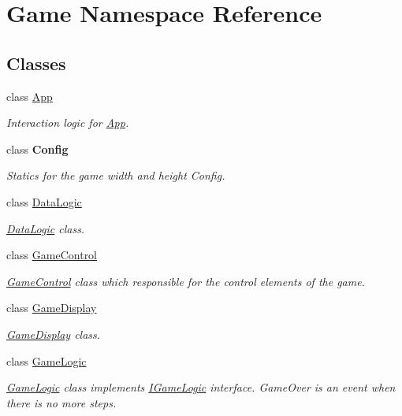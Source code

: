 \hypertarget{namespace_game}{}\section{Game Namespace Reference}
\label{namespace_game}
\subsection*{Classes}
\begin{DoxyCompactItemize}
\item 
class \mbox{\hyperlink{class_game_1_1_app}{App}}
\begin{DoxyCompactList}\small\item\em Interaction logic for \mbox{\hyperlink{class_game_1_1_app}{App}}. \end{DoxyCompactList}\item 
class {\bfseries Config}
\begin{DoxyCompactList}\small\item\em Statics for the game width and height Config. \end{DoxyCompactList}\item 
class \mbox{\hyperlink{class_game_1_1_data_logic}{Data\+Logic}}
\begin{DoxyCompactList}\small\item\em \mbox{\hyperlink{class_game_1_1_data_logic}{Data\+Logic}} class. \end{DoxyCompactList}\item 
class \mbox{\hyperlink{class_game_1_1_game_control}{Game\+Control}}
\begin{DoxyCompactList}\small\item\em \mbox{\hyperlink{class_game_1_1_game_control}{Game\+Control}} class which responsible for the control elements of the game. \end{DoxyCompactList}\item 
class \mbox{\hyperlink{class_game_1_1_game_display}{Game\+Display}}
\begin{DoxyCompactList}\small\item\em \mbox{\hyperlink{class_game_1_1_game_display}{Game\+Display}} class. \end{DoxyCompactList}\item 
class \mbox{\hyperlink{class_game_1_1_game_logic}{Game\+Logic}}
\begin{DoxyCompactList}\small\item\em \mbox{\hyperlink{class_game_1_1_game_logic}{Game\+Logic}} class implements \mbox{\hyperlink{interface_game_1_1_i_game_logic}{I\+Game\+Logic}} interface. Game\+Over is an event when there is no more steps. \end{DoxyCompactList}\item 

\end{DoxyCompactItemize}
